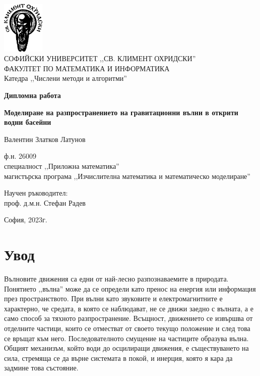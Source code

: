 \documentclass[12pt]{article}
\numberwithin{equation}{section}
\begin{document}
\thispagestyle{empty} %
\begin{center}
    {\large
    \includegraphics[width=0.15\textwidth]{SU.png} \\
    СОФИЙСКИ УНИВЕРСИТЕТ ,,СВ. КЛИМЕНТ ОХРИДСКИ'' \\
    ФАКУЛТЕТ ПО МАТЕМАТИКА И ИНФОРМАТИКА\\
    Катедра ,,Числени методи и алгоритми''
    }
    
    \hrulefill

    \vspace{5em}
    {\Huge
    \textbf{Дипломна работа}
    }

    \vspace{4em}
    \textbf{\Large
    Моделиране на разпространението на гравитационни вълни в открити водни басейни
    }

    \vspace{4em}
    {\Large
    Валентин Златков Латунов
    }
    
    {
    ф.н. 26009 \\
    специалност ,,Приложна математика'' \\
    магистърска програма ,,Изчислителна математика и математическо моделиране''
    }
    
    \vfill
    {
    \hspace{-6pt}Научен ръководител: \\
    проф. д.м.н. Стефан Радев
    }
    \vspace{2em}
    
    София, 2023г.
\end{center}

\newpage

\tableofcontents
\newpage

\section{Увод}
Вълновите движения са едни от най-лесно разпознаваемите в природата. Понятието ,,вълна'' може да се определи като пренос на енергия или информация през пространството. При вълни като звуковите и електромагнитните е характерно, че средата, в която се наблюдават, не се движи заедно с вълната, а е само способ за тяхното разпространение. Всъщност, движението се извършва от отделните частици, които се отместват от своето текущо положение и след това се връщат към него. Последователното смущение на частиците образува вълна. Общият механизъм, който води до осцилиращи движения, е съществуването на сила, стремяща се да върне системата в покой, и инерция, която я кара да задмине това състояние.
\end{document}
